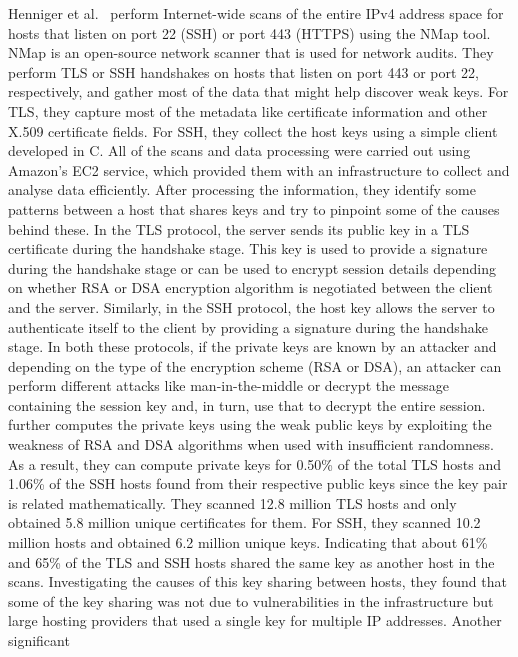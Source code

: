 \label{relevantlit}
Henniger et al.~\cite{180213} perform Internet-wide scans of the entire IPv4 address space for hosts that listen on port 22 (SSH) or 
port 443 (HTTPS) using the NMap tool. NMap is an open-source network scanner that is used for network audits. They perform TLS or SSH handshakes
on hosts that listen on port 443 or port 22, respectively, and gather most of the data that might help discover weak keys. 
For TLS, they capture most of the metadata like certificate information and other X.509 certificate fields. For SSH, they collect the host keys 
using a simple client developed in C. All of the scans and data processing were carried out using Amazon's EC2 service, which provided them with 
an infrastructure to collect and analyse data efficiently. After processing the information, they identify some patterns between 
a host that shares keys and try to pinpoint some of the causes behind these. 
In the TLS protocol, the server sends its public key in a TLS certificate during the handshake stage. This key is 
used to provide a signature during the handshake stage or can be used to encrypt session details depending on whether RSA or DSA encryption algorithm is 
negotiated between the client and the server. Similarly, in the SSH protocol, the host key allows the server to authenticate itself to the client by providing a signature during 
the handshake stage. In both these protocols, if the private keys are known by an attacker and depending on the type of the 
encryption scheme (RSA or DSA), an attacker can perform different attacks like man-in-the-middle or decrypt the message containing
the session key and, in turn, use that to decrypt the entire session.\\
\cite{180213} further computes the private keys using the weak public keys by exploiting the weakness of RSA and DSA algorithms when used 
with insufficient randomness. As a result, they can compute private keys for 0.50\% of the total TLS hosts and 1.06\% of the SSH hosts found from their 
respective public keys since the key pair is related mathematically.  
They scanned 12.8 million TLS hosts and only obtained 5.8 million unique certificates for them. For SSH, they scanned 10.2 million hosts 
and obtained 6.2 million unique keys. Indicating that about 61\%  and 65\% of the TLS and SSH hosts shared the same key as another host 
in the scans. Investigating the causes of this key sharing between hosts, they found that some of the key sharing was not 
due to vulnerabilities in the infrastructure but large hosting providers that used a single key for multiple IP addresses. Another significant 
